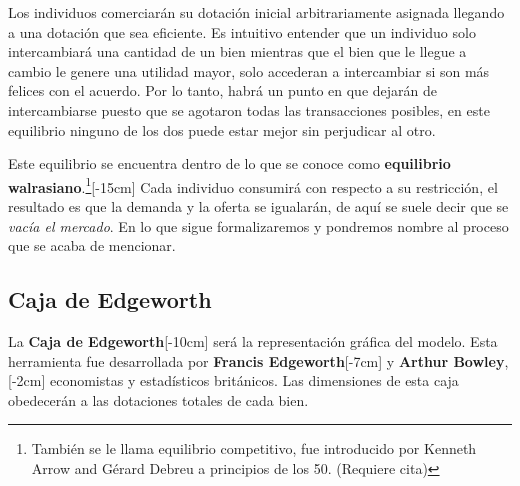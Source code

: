 Los individuos comerciarán su dotación inicial arbitrariamente asignada llegando a una dotación que sea eficiente. Es intuitivo entender que un individuo solo intercambiará una cantidad de un bien mientras que el bien que le llegue a cambio le genere una utilidad mayor, solo accederan a intercambiar si son más felices con el acuerdo. Por lo tanto, habrá un punto en que dejarán de intercambiarse puesto que se agotaron todas las transacciones posibles, en este equilibrio ninguno de los dos puede estar mejor sin perjudicar al otro.

Este equilibrio se encuentra dentro de lo que se conoce como \textbf{equilibrio walrasiano}.\footnote{También se le llama equilibrio competitivo, fue introducido por Kenneth Arrow and Gérard Debreu a principios de los 50. (Requiere cita)}[-15cm] Cada individuo consumirá con respecto a su restricción, el resultado es que la demanda y la oferta se igualarán, de aquí se suele decir que se \textit{vacía el mercado}. En lo que sigue formalizaremos y pondremos nombre al proceso que se acaba de mencionar.

\subsection{Caja de Edgeworth}

La \textbf{Caja de Edgeworth}[-10cm] será la representación gráfica del modelo. Esta herramienta fue desarrollada por \textbf{Francis Edgeworth}[-7cm] y \textbf{Arthur Bowley},[-2cm] economistas y estadísticos británicos. Las dimensiones de esta caja obedecerán a las dotaciones totales de cada bien. 

